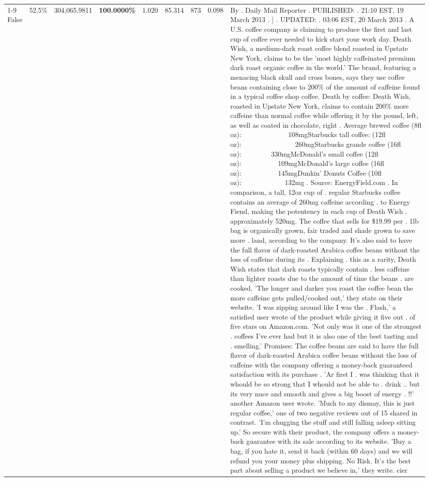 \begin{table}[H]
{\begin{tabular}{lllrlllll}
\cline{1-9} \cline{2-9}
False & 52.5\% & 304,065.9811 & \bfseries \color{red} 100.0000\% & 1.020 & 85.314 & 873 & 0.098 & By . Daily Mail Reporter . PUBLISHED: . 21:10 EST, 19 March 2013 . | . UPDATED: . 03:06 EST, 20 March 2013 . A U.S. coffee company is claiming to produce the first and last cup of coffee ever needed to kick start your work day. Death Wish, a medium-dark roast coffee blend roasted in Upstate New York, claims to be the 'most highly caffeinated premium dark roast organic coffee in the world.' The brand, featuring a menacing black skull and cross bones, says they use coffee beans containing close to 200\% of the amount of caffeine found in a typical coffee shop coffee. Death by coffee: Death Wish, roasted in Upstate New York, claims to contain 200\% more caffeine than normal coffee while offering it by the pound, left, as well as coated in chocolate, right . Average brewed coffee (8fl oz):              108mgStarbucks tall coffee: (12fl oz):                260mgStarbucks grande coffee (16fl oz):         330mgMcDonald's small coffee (12fl oz):           109mgMcDonald's large coffee (16fl oz):           145mgDunkin' Donuts Coffee (10fl oz):             132mg . Source: EnergyField.com . In comparison, a tall, 12oz cup of . regular Starbucks coffee contains an average of 260mg caffeine according . to Energy Fiend, making the potentency in each cup of Death Wish . approximately 520mg. The coffee that sells for \$19.99 per . 1lb bag is organically grown, fair traded and shade grown to save more . land, according to the company. It's also said to have the full flavor of dark-roasted Arabica coffee beans without the loss of caffeine during its . Explaining . this as a rarity, Death Wish states that dark roasts typically contain . less caffeine than lighter roasts due to the amount of time the beans . are cooked. 'The longer and darker you roast the coffee bean the more caffeine gets pulled/cooked out,' they state on their website. 'I was zipping around like I was the . Flash,' a satisfied user wrote of the product while giving it five out . of five stars on Amazon.com. 'Not only was it one of the strongest . coffees I've ever had but it is also one of the best tasting and . smelling.’ Promises: The coffee beans are said to have the full flavor of dark-roasted Arabica coffee beans without the loss of caffeine with the company offering a money-back guaranteed satisfaction with its purchase . 'Ar first I . was thinking that it whould be so strong that I whould not be able to . drink .. but its very nuce and smooth and gives a big boost of energy . !!' another Amazon user wrote. 'Much to my dismay, this is just regular coffee,' one of two negative reviews out of 15 shared in contrast. 'I'm chugging the stuff and still falling asleep sitting up.' So secure with their product, the company offers a money-back guarantee with its sale according to its website. 'Buy a bag, if you hate it, send it back (within 60 days) and we will refund you your money plus shipping. No Risk. It’s the best part about selling a product we believe in,' they write. cier \\

\end{tabular}}
\end{table}
